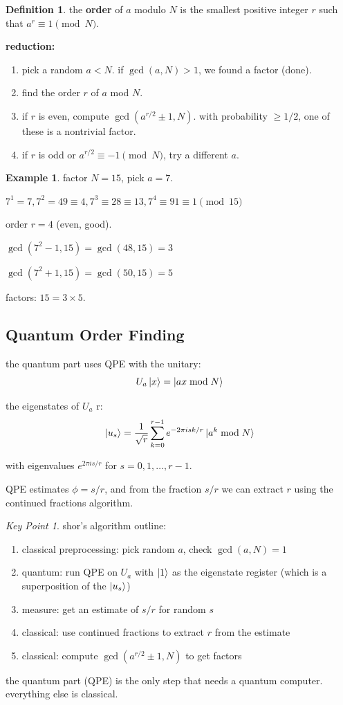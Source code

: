 \documentclass[11pt,a4paper]{article}
\theoremstyle{definition}
\newtheorem{definition}{Definition}[section]
\newtheorem{example}{Example}[section]
\theoremstyle{remark}
\newtheorem*{keypoint}{Key Point}
\begin{document}
\begin{definition}
the \textbf{order} of $a$ modulo $N$ is the smallest positive integer $r$ such that $a^r \equiv 1 \pmod{N}$.
\end{definition}

\textbf{reduction:}
\begin{enumerate}
    \item pick a random $a < N$. if $\gcd(a, N) > 1$, we found a factor (done).
    \item find the order $r$ of $a$ mod $N$.
    \item if $r$ is even, compute $\gcd(a^{r/2} \pm 1, N)$. with probability $\geq 1/2$, one of these is a nontrivial factor.
    \item if $r$ is odd or $a^{r/2} \equiv -1 \pmod{N}$, try a different $a$.
\end{enumerate}

\begin{example}
factor $N = 15$, pick $a = 7$.

$7^1 = 7, 7^2 = 49 \equiv 4, 7^3 \equiv 28 \equiv 13, 7^4 \equiv 91 \equiv 1 \pmod{15}$

order $r = 4$ (even, good).

$\gcd(7^2 - 1, 15) = \gcd(48, 15) = 3$

$\gcd(7^2 + 1, 15) = \gcd(50, 15) = 5$

factors: $15 = 3 \times 5$.
\end{example}

\subsection{Quantum Order Finding}

the quantum part uses QPE with the unitary:
\[
U_a\ket{x} = \ket{ax \bmod N}
\]

the eigenstates of $U_a$ r:
\[
\ket{u_s} = \frac{1}{\sqrt{r}}\sum_{k=0}^{r-1} e^{-2\pi isk/r}\ket{a^k \bmod N}
\]

with eigenvalues $e^{2\pi is/r}$ for $s = 0, 1, \ldots, r-1$.

QPE estimates $\phi = s/r$, and from the fraction $s/r$ we can extract $r$ using the continued fractions algorithm.

\begin{keypoint}
shor's algorithm outline:
\begin{enumerate}
    \item classical preprocessing: pick random $a$, check $\gcd(a, N) = 1$
    \item quantum: run QPE on $U_a$ with $\ket{1}$ as the eigenstate register (which is a superposition of the $\ket{u_s}$)
    \item measure: get an estimate of $s/r$ for random $s$
    \item classical: use continued fractions to extract $r$ from the estimate
    \item classical: compute $\gcd(a^{r/2} \pm 1, N)$ to get factors
\end{enumerate}
the quantum part (QPE) is the only step that needs a quantum computer. everything else is classical.
\end{keypoint}
\end{document}
